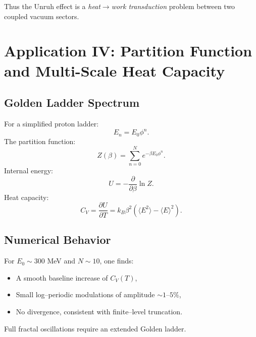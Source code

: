 \documentclass[11pt]{article}
\begin{document}
            Thus the Unruh effect is a \emph{heat$\rightarrow$work transduction} problem
            between two coupled vacuum sectors.

    \section{Application IV: Partition Function and Multi-Scale Heat Capacity}

        \subsection{Golden Ladder Spectrum}

            For a simplified proton ladder:
            \begin{equation}
                E_n = E_0 \phi^n.
            \end{equation}
            The partition function:
            \begin{equation}
                Z(\beta) = \sum_{n=0}^{N} e^{-\beta E_0 \phi^n}.
            \end{equation}
            Internal energy:
            \begin{equation}
                U = -\frac{\partial}{\partial\beta} \ln Z.
            \end{equation}
            Heat capacity:
            \begin{equation}
                C_V = \frac{\partial U}{\partial T}
                = k_B \beta^2 ( \langle E^2\rangle - \langle E\rangle^2 ).
            \end{equation}

        \subsection{Numerical Behavior}

            For $E_0 \sim 300$ MeV and $N \sim 10$, one finds:
            \begin{itemize}
                \item A smooth baseline increase of $C_V(T)$,
                \item Small log--periodic modulations of amplitude $\sim 1$--$5\%$,
                \item No divergence, consistent with finite--level truncation.
            \end{itemize}
            Full fractal oscillations require an extended Golden ladder.
\end{document}

